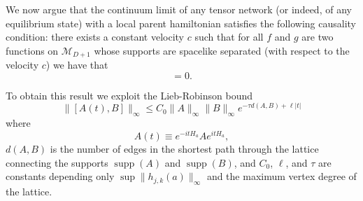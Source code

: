 \documentclass[prl,twocolumn,lengthcheck,superscriptaddress]{revtex4-1}
\newcommand{\supp}{\operatorname{supp}}
\theoremstyle{definition}
\theoremstyle{remark}
\begin{document}
We now argue that the continuum limit of any tensor network (or indeed, of any equilibrium state) with a local parent hamiltonian satisfies the following causality condition: there exists a constant velocity $c$ such that for all $f$ and $g$ are two functions on $\mathcal{M}_{D+1}$ whose supports are spacelike separated (with respect to the velocity $c$) we have that
\begin{equation}
	[\widehat{\phi}(f), \widehat{\phi}(g)]  = 0.
\end{equation}

To obtain this result we exploit the Lieb-Robinson bound
\begin{equation}
	\| [A(t), B] \|_{\infty} \le C_0 \|A\|_\infty \|B\|_\infty e^{-{\tau} d(A,B) + \ell |t|}
\end{equation}
where
\begin{equation}
	A(t) \equiv e^{-itH_a} A e^{itH_a},
\end{equation} 
$d(A,B)$ is the number of edges in the shortest path through the lattice connecting the supports $\supp(A)$ and $\supp(B)$, and $C_0$, $\ell$, and $\tau$ are constants depending only $\sup \|h_{j,k}(a)\|_\infty$ and the maximum vertex degree of the lattice.
\end{document}
